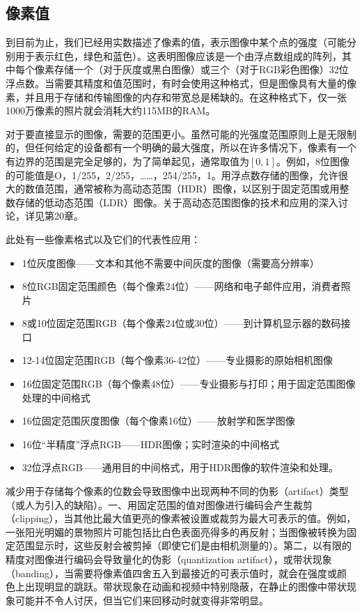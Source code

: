 \documentclass[lang=cn,12pt]{elegantbook}
\begin{document}
\subsection{像素值}

到目前为止，我们已经用实数描述了像素的值，表示图像中某个点的强度（可能分别用于表示红色，绿色和蓝色）。这表明图像应该是一个由浮点数组成的阵列，其中每个像素存储一个（对于灰度或黑白图像）或三个（对于RGB彩色图像）32位浮点数。当需要其精度和值范围时，有时会使用这种格式，但是图像具有大量的像素，并且用于存储和传输图像的内存和带宽总是稀缺的。在这种格式下，仅一张1000万像素的照片就会消耗大约115MB的RAM。


对于要直接显示的图像，需要的范围更小。虽然可能的光强度范围原则上是无限制的，但任何给定的设备都有一个明确的最大强度，所以在许多情况下，像素有一个有边界的范围是完全足够的，为了简单起见，通常取值为$[0,1]$。例如，8位图像的可能值是O，1/255，2/255，……，254/255，1。用浮点数存储的图像，允许很大的数值范围，通常被称为高动态范围（HDR）图像，以区别于固定范围或用整数存储的低动态范围（LDR）图像。关于高动态范围图像的技术和应用的深入讨论，详见第20章。


此处有一些像素格式以及它们的代表性应用：

\begin{itemize}
  \item 1位灰度图像——文本和其他不需要中间灰度的图像（需要高分辨率）
  \item 8位RGB固定范围颜色（每个像素24位）——网络和电子邮件应用，消费者照片
  \item 8或10位固定范围RGB（每个像素24位或30位）——到计算机显示器的数码接口
  \item 12-14位固定范围RGB（每个像素36-42位）——专业摄影的原始相机图像
  \item 16位固定范围RGB（每个像素48位）——专业摄影与打印；用于固定范围图像处理的中间格式
  \item 16位固定范围灰度图像（每个像素16位）——放射学和医学图像
  \item 16位“半精度”浮点RGB——HDR图像；实时渲染的中间格式
  \item 32位浮点RGB——通用目的中间格式，用于HDR图像的软件渲染和处理。
\end{itemize}

减少用于存储每个像素的位数会导致图像中出现两种不同的伪影（artifact）类型（或人为引入的缺陷）。一、用固定范围的值对图像进行编码会产生裁剪（clipping），当其他比最大值更亮的像素被设置或裁剪为最大可表示的值。例如，一张阳光明媚的景物照片可能包括比白色表面亮得多的再反射；当图像被转换为固定范围显示时，这些反射会被剪掉（即使它们是由相机测量的）。第二，以有限的精度对图像进行编码会导致量化的伪影（quantization artifact），或带状现象（banding），当需要将像素值四舍五入到最接近的可表示值时，就会在强度或颜色上出现明显的跳跃。带状现象在动画和视频中特别隐蔽，在静止的图像中带状现象可能并不令人讨厌，但当它们来回移动时就变得非常明显。
\end{document}
